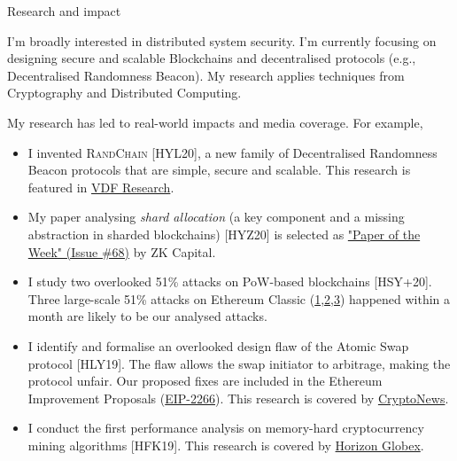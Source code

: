 \documentclass{resume} %
\begin{document}
\begin{rSection}{Research and impact}

I'm broadly interested in distributed system security.
I'm currently focusing on designing secure and scalable Blockchains and decentralised protocols (e.g., Decentralised Randomness Beacon).
My research applies techniques from Cryptography and Distributed Computing.

My research has led to real-world impacts and media coverage. For example,
\begin{itemize}
    \item I invented \textsc{RandChain} [HYL20], a new family of Decentralised Randomness Beacon protocols that are simple, secure and scalable. This research  is featured in \href{https://vdfresearch.org/}{VDF Research}.
    \item My paper analysing \emph{shard allocation} (a key component and a missing abstraction in sharded blockchains) [HYZ20] is selected as \href{https://zkcapital.substack.com/}{"Paper of the Week" (Issue \#68)} by ZK Capital.
    \item I study two overlooked 51\% attacks on PoW-based blockchains [HSY+20]. Three large-scale 51\% attacks on Ethereum Classic (\href{https://news.bitcoin.com/ethereum-classic-suffers-51-attack-again-delisting-risk-amplified}{1},\href{https://decrypt.co/40196/hackers-launch-third-51-attack-on-ethereum-classic-this-month}{2},\href{https://coingeek.com/over-1m-double-spent-in-latest-ethereum-classic-51-attack}{3}) happened within a month are likely to be our analysed attacks.
    \item I identify and formalise an overlooked design flaw of the Atomic Swap protocol [HLY19]. The flaw allows the swap initiator to arbitrage, making the protocol unfair. Our proposed fixes are included in the Ethereum Improvement Proposals (\href{https://github.com/ethereum/EIPs/issues/2266}{EIP-2266}). This research is covered by \href{https://cryptonews.com.au/monash-university-researchers-developing-cryptocurrency-transaction-platform}{CryptoNews}.
    \item I conduct the first performance analysis on memory-hard cryptocurrency mining algorithms [HFK19]. This research is covered by \href{https://medium.com/@horizonfintex/blockchain-research-bytes-1-9d023e080765}{Horizon Globex}.
\end{itemize}

\end{rSection}
\end{document}

